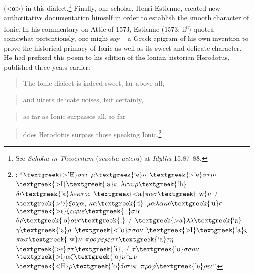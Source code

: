 (<α>) in this dialect.\footnote{See \textit{Scholia} \textit{in} \textit{Theocritum} (\textit{scholia} \textit{uetera}) at \textit{Idyllia} 15.87–88.} Finally, one scholar, Henri Estienne, created new authoritative documentation himself in order to establish the smooth character of Ionic. In his commentary on Attic of 1573, Estienne (1573: ii\textsc{\textsuperscript{r}}) quoted – somewhat pretentiously, one might say – a Greek epigram of his own invention to prove the historical primacy of Ionic as well as its sweet and delicate character. He had prefixed this poem to his edition of the Ionian historian Herodotus, published three years earlier:

\begin{quote}
The Ionic dialect is indeed sweet, far above all,
\end{quote}

\begin{quote}
and utters delicate noises, but certainly,
\end{quote}

\begin{quote}
as far as Ionic surpasses all, so far
\end{quote}

\begin{quote}
does Herodotus surpass those speaking Ionic.\footnote{\citet[8]{Estienne1570}: “$\text{\textgreek{>'E}}\sigma \tau \iota $ $\mu \text{\textgreek{`e}}\nu $ $\text{\textgreek{>'e}}\sigma \tau \iota \nu $ $\text{\textgreek{>I}}\text{\textgreek{`a}}\varsigma $ $\lambda \iota \gamma \upsilon \rho \text{\textgreek{`h}}$ $\delta \iota \text{\textgreek{'a}}\lambda \varepsilon \kappa \tau o\varsigma $ $\text{\textgreek{<a}}\pi \alpha \sigma \text{\textgreek{~w}}\nu $ / $\text{\textgreek{>'e}}\xi o\chi \alpha $, $\kappa \alpha \text{\textgreek{`i}}$ $\mu \alpha \lambda \alpha \kappa o\text{\textgreek{`u}}\varsigma $ $\text{\textgreek{>e}}\xi \alpha \varphi \iota \varepsilon \text{\textgreek{~i}}\sigma \alpha $ $\theta \rho \text{\textgreek{'o}}o\upsilon \varsigma \text{\textgreek{;}}$ / $\text{\textgreek{>a}}\lambda \lambda \text{\textgreek{`a}}$ $\gamma \text{\textgreek{`a}}\rho $ $\text{\textgreek{<'o}}\sigma \sigma o\nu $ $\text{\textgreek{>I}}\text{\textgreek{`a}}\varsigma $ $\pi \alpha \sigma \text{\textgreek{~w}}\nu $ $\pi \rho o\varphi \varepsilon \rho \varepsilon \sigma \tau \text{\textgreek{'a}}\tau \eta $ $\text{\textgreek{>e}}\sigma \tau \text{\textgreek{'i}}$, / $\tau \text{\textgreek{'o}}\sigma \sigma o\nu $ $\text{\textgreek{>i}}\alpha \zeta \text{\textgreek{'o}}\nu \tau \omega \nu $ $\text{\textgreek{<H}}\rho \text{\textgreek{'o}}\delta o\tau o\varsigma $ $\pi \rho o\varphi \text{\textgreek{'e}}\rho \varepsilon \iota $”.}
\end{quote}

